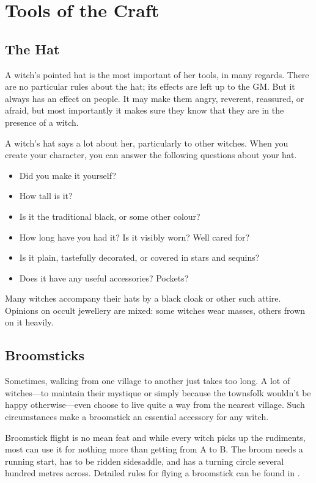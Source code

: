 \chapter{Tools of the Craft}

\section{The Hat}

A witch's pointed hat is the most important of her tools, in many regards.
There are no particular rules about the hat; its effects are left up to the GM.
But it always has an effect on people.
It may make them angry, reverent, reassured, or afraid, but most importantly it makes sure they know that they are in the presence of a witch.

A witch's hat says a lot about her, particularly to other witches.
When you create your character, you can answer the following questions about your hat.

\begin{itemize}
	\item Did you make it yourself?
	\item How tall is it?
	\item Is it the traditional black, or some other colour?
	\item How long have you had it?
		Is it visibly worn?
		Well cared for?
	\item Is it plain, tastefully decorated, or covered in stars and sequins?
	\item Does it have any useful accessories?
		Pockets?
\end{itemize}

Many witches accompany their hats by a black cloak or other such attire.
Opinions on occult jewellery are mixed: some witches wear masses, others frown on it heavily.



\section{Broomsticks}

Sometimes, walking from one village to another just takes too long.
A lot of witches---to maintain their mystique or simply because the townsfolk wouldn't be happy otherwise---even choose to live quite a way from the nearest village.
Such circumstances make a broomstick an essential accessory for any witch.

Broomstick flight is no mean feat and while every witch picks up the rudiments, most can use it for nothing more than getting from A to B.
The broom needs a running start, has to be ridden sidesaddle, and has a turning circle several hundred metres across.
Detailed rules for flying a broomstick can be found in .

